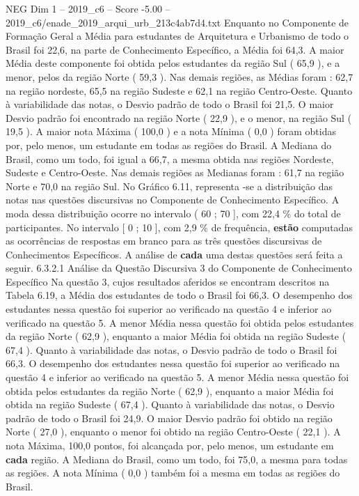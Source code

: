 \begin{textsample}{NEG Dim 1 – 2019\_c6 – Score -5.00 – 2019\_c6/enade\_2019\_arqui\_urb\_213c4ab7d4.txt}
Enquanto no Componente de Formação Geral a Média para estudantes de Arquitetura e Urbanismo de todo o Brasil foi 22,6, na parte de Conhecimento Específico, a Média foi 64,3.
A maior Média deste componente foi obtida pelos estudantes da região Sul ( 65,9 ), e a menor, pelos da região Norte ( 59,3 ).
Nas demais regiões, as Médias foram : 62,7 na região nordeste, 65,5 na região Sudeste e 62,1 na região Centro-Oeste.
Quanto à variabilidade das notas, o Desvio padrão de todo o Brasil foi 21,5.
O maior Desvio padrão foi encontrado na região Norte ( 22,9 ), e o menor, na região Sul ( 19,5 ).
A maior nota Máxima ( 100,0 ) e a nota Mínima ( 0,0 ) foram obtidas por, pelo menos, um estudante em todas as regiões do Brasil.
A Mediana do Brasil, como um todo, foi igual a 66,7, a mesma obtida nas regiões Nordeste, Sudeste e Centro-Oeste.
Nas demais regiões as Medianas foram : 61,7 na região Norte e 70,0 na região Sul.
No Gráfico 6.11, representa -se a distribuição das notas nas questões discursivas no Componente de Conhecimento Específico.
A moda dessa distribuição ocorre no intervalo ( 60 ; 70 ], com 22,4 \% do total de participantes.
No intervalo [ 0 ; 10 ], com 2,9 \% de frequência, \textbf{estão} computadas as ocorrências de respostas em branco para as três questões discursivas de Conhecimentos Específicos.
A análise de \textbf{cada} uma destas questões será feita a seguir. 6.3.2.1 Análise da Questão Discursiva 3 do Componente de Conhecimento Específico Na questão 3, cujos resultados aferidos se encontram descritos na Tabela 6.19, a Média dos estudantes de todo o Brasil foi 66,3.
O desempenho dos estudantes nessa questão foi superior ao verificado na questão 4 e inferior ao verificado na questão 5.
A menor Média nessa questão foi obtida pelos estudantes da região Norte ( 62,9 ), enquanto a maior Média foi obtida na região Sudeste ( 67,4 ).
Quanto à variabilidade das notas, o Desvio padrão de todo o Brasil foi 66,3.
O desempenho dos estudantes nessa questão foi superior ao verificado na questão 4 e inferior ao verificado na questão 5.
A menor Média nessa questão foi obtida pelos estudantes da região Norte ( 62,9 ), enquanto a maior Média foi obtida na região Sudeste ( 67,4 ).
Quanto à variabilidade das notas, o Desvio padrão de todo o Brasil foi 24,9.
O maior Desvio padrão foi obtido na região Norte ( 27,0 ), enquanto o menor foi obtido na região Centro-Oeste ( 22,1 ).
A nota Máxima, 100,0 pontos, foi alcançada por, pelo menos, um estudante em \textbf{cada} região.
A Mediana do Brasil, como um todo, foi 75,0, a mesma para todas as regiões.
A nota Mínima ( 0,0 ) também foi a mesma em todas as regiões do Brasil.

\end{textsample}
